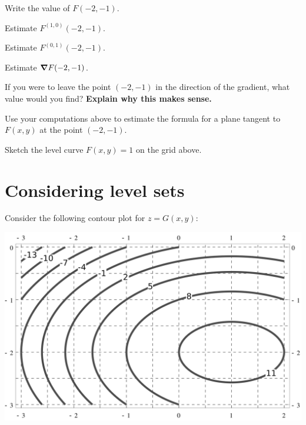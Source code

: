 \documentclass[handout,noauthor,nooutcomes]{ximera}
\begin{document}
\begin{problem}
  Write the value of $F(-2,-1)$.
\end{problem}


\begin{problem}
  Estimate $F^{(1,0)}(-2,-1)$.
\end{problem}

\begin{problem}
  Estimate $F^{(0,1)}(-2,-1)$.
\end{problem}

\begin{problem}
  Estimate $\boldsymbol\nabla F(-2,-1)$.
\end{problem}

\begin{problem}
  If you were to leave the point $(-2,-1)$ in the direction of the
  gradient, what value would you find? \textbf{Explain why this makes
    sense.}
\end{problem}


\begin{problem}
  Use your computations above to estimate the formula for a plane
  tangent to $F(x,y)$ at the point $(-2,-1)$.
\end{problem}

\begin{problem}
  Sketch the level curve $F(x,y) = 1$ on the grid above.
\end{problem}

\section{Considering level sets}


Consider the following contour plot for $z=G(x,y)$:
\begin{image}[5in]
  \includegraphics{contours.png}
\end{image}
\end{document}
